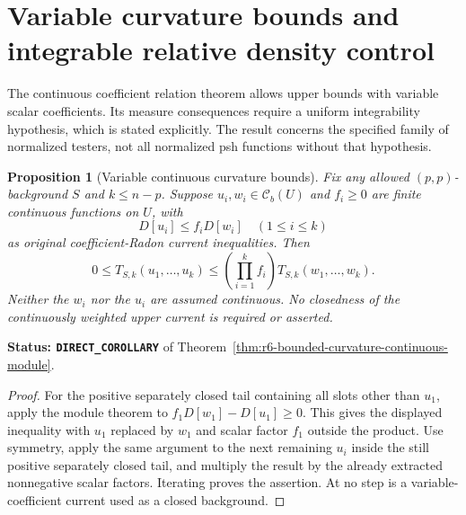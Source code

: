 \documentclass[11pt,a4paper]{article}
\numberwithin{equation}{section}
\newtheorem{proposition}[theorem]{Proposition}
\theoremstyle{definition}
\theoremstyle{remark}
\begin{document}


\section{Variable curvature bounds and integrable relative density control}
\label{sec:r6-variable-curvature-dominators}

The continuous coefficient relation theorem allows upper bounds with
variable scalar coefficients. Its measure consequences require a
uniform integrability hypothesis, which is stated explicitly. The
result concerns the specified family of normalized testers, not all
normalized psh functions without that hypothesis.

\begin{proposition}[Variable continuous curvature bounds]
\label{prop:r6-variable-curvature-domination}
Fix any allowed $(p,p)$-background $S$ and $k\le n-p$. Suppose
$u_i,w_i\in\mathcal C_b(U)$ and $f_i\ge0$ are finite continuous
functions on $U$, with
\[
                         D[u_i]\le f_iD[w_i]
                              \quad(1\le i\le k)
\]
as original coefficient-Radon current inequalities. Then
\[
 0\le T_{S,k}(u_1,\ldots,u_k)
       \le \left(\prod_{i=1}^k f_i\right)
                                T_{S,k}(w_1,\ldots,w_k).
\]
Neither the $w_i$ nor the $u_i$ are assumed continuous. No closedness
of the continuously weighted upper current is required or asserted.
\end{proposition}

\noindent\textbf{Status: \texttt{DIRECT\_COROLLARY}} of
Theorem~\ref{thm:r6-bounded-curvature-continuous-module}.

\begin{proof}
For the positive separately closed tail containing all slots other
than $u_1$, apply the module theorem to
$f_1D[w_1]-D[u_1]\ge0$. This gives the displayed inequality with
$u_1$ replaced by $w_1$ and scalar factor $f_1$ outside the product.
Use symmetry, apply the same argument to the next remaining $u_i$
inside the still positive separately closed tail, and multiply the
result by the already extracted nonnegative scalar factors. Iterating
proves the assertion. At no step is a variable-coefficient current
used as a closed background.
\end{proof}
\end{document}
